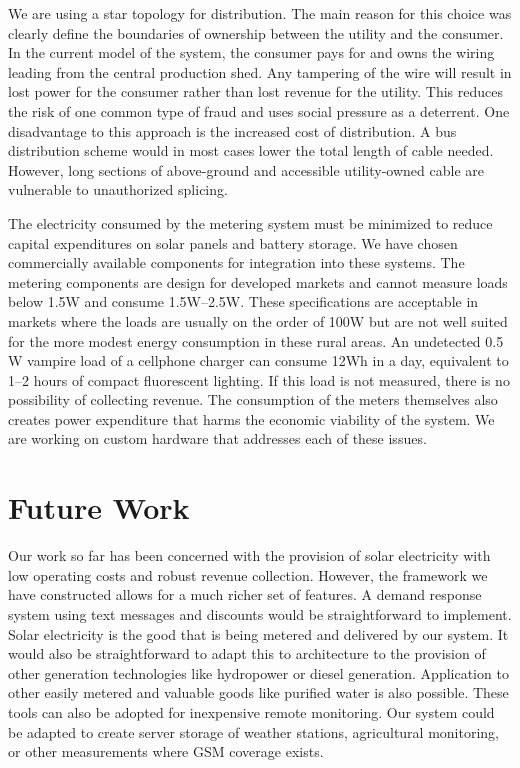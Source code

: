 \documentclass{sig-alternate}
\begin{document}
We are using a star topology for distribution.  The main reason for this
choice was clearly define the boundaries of ownership between the utility
and the consumer.  In the current model of the system, the consumer pays for
and owns the wiring leading from the central production shed.  Any tampering
of the wire will result in lost power for the consumer rather than lost
revenue for the utility.  This reduces the risk of one common type of fraud
and uses social pressure as a deterrent.
One disadvantage to this approach is the increased cost of distribution.
A bus distribution scheme would in most cases lower the total length of
cable needed.  However, long sections of above-ground and accessible
utility-owned cable are vulnerable to unauthorized splicing.

The electricity consumed by the metering system must be minimized to
reduce capital expenditures on solar panels and battery storage.  We
have chosen commercially available components for integration into
these systems.  The metering components are design for developed markets
and cannot measure loads below 1.5W and consume 1.5W--2.5W.  These
specifications are acceptable in markets where the loads are usually
on the order of 100W but are not well suited for the more modest
energy consumption in these rural areas.  An undetected 0.5 W vampire load of a
cellphone charger can consume 12Wh in a day, equivalent to 1--2 hours
of compact fluorescent lighting.  If this load is not measured, there
is no possibility of collecting revenue.  The consumption of the meters
themselves also creates power expenditure that harms the economic viability
of the system.  We are working on custom hardware that addresses each
of these issues.

\section{Future Work}

Our work so far has been concerned with the
provision of solar electricity with low operating costs and robust revenue
collection.  However, the framework we have constructed allows for a much
richer set of features.
A demand response system using text messages and discounts
would be straightforward to implement.
Solar electricity is the good that is being metered and delivered by our
system.  It would also be straightforward to adapt this to architecture
to the provision of other generation technologies like hydropower or
diesel generation.  Application to other easily metered and valuable goods
like purified water is also possible.
These tools can also be adopted for inexpensive remote monitoring.  Our
system could be adapted to create server storage of weather stations,
agricultural monitoring, or other measurements where GSM coverage exists.
\end{document}

